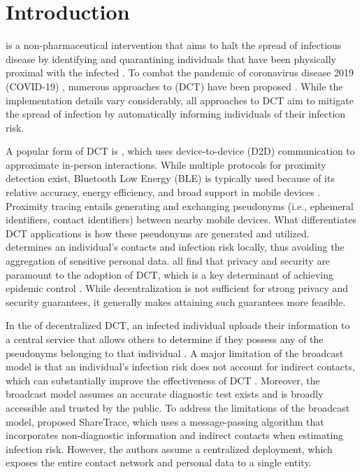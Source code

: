 \chapter{Introduction}

 is a non-pharmaceutical intervention that aims to halt the spread of infectious disease by identifying and quarantining individuals that have been physically proximal with the infected \citep{PozoMartin2023}. To combat the pandemic of coronavirus disease 2019 (COVID-19) \citep{Zhu2020, Gorbalenya2020, Singh2021}, numerous approaches to  (DCT) have been proposed \citep{Shubina2020, Reichert2021, Troncoso2022, Gupta2023, Cherini2023}. While the implementation details vary considerably, all approaches to DCT aim to mitigate the spread of infection by automatically informing individuals of their infection risk.

A popular form of DCT is , which uses device-to-device (D2D) communication \citep{Haus2017} to approximate in-person interactions. While multiple protocols for proximity detection exist, Bluetooth Low Energy (BLE) is typically used because of its relative accuracy, energy efficiency, and broad support in mobile devices \citep{Shubina2020, Reichert2021}. Proximity tracing entails generating and exchanging pseudonyms (i.e., ephemeral identifiers, contact identifiers) between nearby mobile devices. What differentiates DCT applications is how these pseudonyms are generated and utilized.  determines an individual's contacts and infection risk locally, thus avoiding the aggregation of sensitive personal data. \citet{Oyibo2022, Afroogh2022, Simko2022} all find that privacy and security are paramount to the adoption of DCT, which is a key determinant of achieving epidemic control \citep{PozoMartin2023}. While decentralization is not sufficient for strong privacy and security guarantees, it generally makes attaining such guarantees more feasible.

In the  of decentralized DCT, an infected individual uploads their information to a central service that allows others to determine if they possess any of the pseudonyms belonging to that individual \citep{Reichert2021}. A major limitation of the broadcast model is that an individual's infection risk does not account for indirect contacts, which can substantially improve the effectiveness of DCT \citep{PozoMartin2023}. Moreover, the broadcast model assumes an accurate diagnostic test exists and is broadly accessible and trusted by the public. To address the limitations of the broadcast model, \citet{Ayday2021} proposed ShareTrace, which uses a message-passing algorithm that incorporates non-diagnostic information and indirect contacts when estimating infection risk. However, the authors assume a centralized deployment, which exposes the entire contact network and personal data to a single entity.

